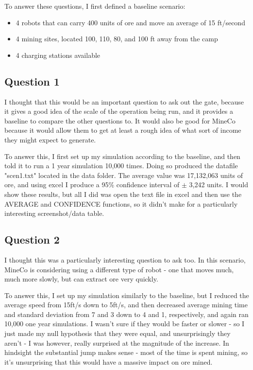 \documentclass{article}
\begin{document}
To answer these questions, I first defined a baseline scenario:
\begin{itemize}
\item 4 robots that can carry 400 units of ore and move an average of 15 ft/second
\item 4 mining sites, located 100, 110, 80, and 100 ft away from the camp
\item 4 charging stations available
\end{itemize}

\subsection{Question 1}
I thought that this would be an important question to ask out the gate, because it gives a good idea of the scale of the operation being run, and it provides a baseline to compare the other questions to.
It would also be good for MineCo because it would allow them to get at least a rough idea of what sort of income they might expect to generate.

To answer this, I first set up my simulation according to the baseline, and then told it to run a 1 year simulation 10,000 times.
Doing so produced the datafile "scen1.txt" located in the data folder.
The average value was 17,132,063 units of ore, and using excel I produce a 95\% confidence interval of $\pm$ 3,242 units. I would show these results, but all I did was open the text file in excel and then use the AVERAGE and CONFIDENCE functions, so it didn't make for a particularly interesting screenshot/data table.

\subsection{Question 2}
I thought this was a particularly interesting question to ask too.
In this scenario, MineCo is considering using a different type of robot - one that moves much, much more slowly, but can extract ore very quickly.

To answer this, I set up my simulation similarly to the baseline, but I reduced the average speed from 15ft/s down to 5ft/s, and then decreased average mining time and standard deviation from 7 and 3 down to 4 and 1, respectively, and again ran 10,000 one year simulations. I wasn't sure if they would be faster or slower - so I just made my null hypothesis that they were equal, and unsurprisingly they aren't -  I was however, really surprised at the magnitude of the increase.
In hindsight the substantial jump makes sense - most of the time is spent mining, so it's unsurprising that this would have a massive impact on ore mined.
\end{document}
